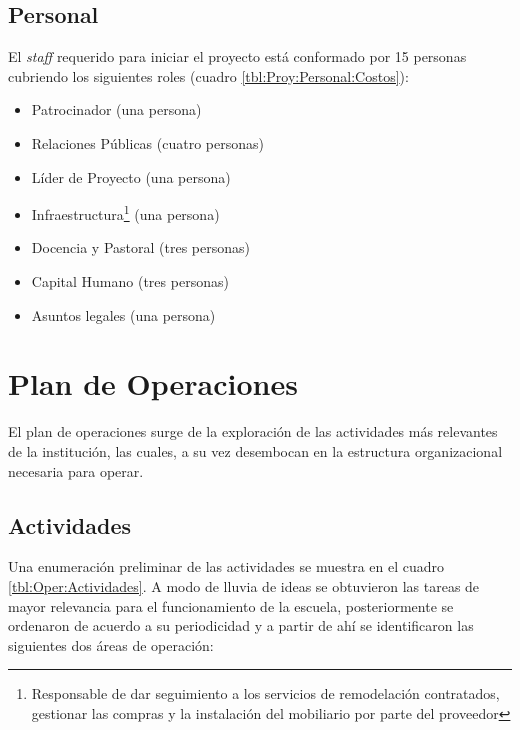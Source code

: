\subsection{Personal}

El \emph{staff} requerido para iniciar el proyecto está conformado por 15 personas cubriendo los siguientes roles (cuadro \ref{tbl:Proy:Personal:Costos}):

\begin{itemize}
	\item Patrocinador (una persona)
	\item Relaciones Públicas (cuatro personas)
	\item Líder de Proyecto (una persona)
	\item Infraestructura\footnote{Responsable de dar seguimiento a los servicios de remodelación contratados, gestionar las compras y la instalación del mobiliario por parte del proveedor} (una persona)
	\item Docencia y Pastoral (tres personas)
	\item Capital Humano (tres personas)
	\item Asuntos legales (una persona)
\end{itemize}

\clearpage









\clearpage

\section{Plan de Operaciones}

El plan de operaciones surge de la exploración de las actividades más relevantes de la institución, las cuales, a su vez desembocan en la estructura organizacional necesaria para operar.

\subsection{Actividades}

Una enumeración preliminar de las actividades se muestra en el cuadro \ref{tbl:Oper:Actividades}. A modo de lluvia de ideas se obtuvieron las tareas de mayor relevancia para el funcionamiento de la escuela, posteriormente se ordenaron de acuerdo a su periodicidad y a partir de ahí se identificaron las siguientes dos áreas de operación:

